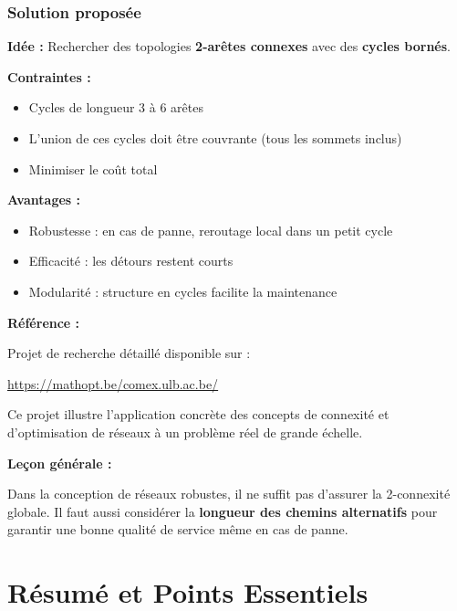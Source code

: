 \documentclass[12pt,a4paper]{article}
\begin{document}
\subsubsection{Solution proposée}

\begin{definition}
\textbf{Idée :} Rechercher des topologies \textcolor{defvert}{\textbf{2-arêtes connexes}} avec des \textcolor{algoviolet}{\textbf{cycles bornés}}.

\textbf{Contraintes :}
\begin{itemize}
    \item Cycles de longueur 3 à 6 arêtes
    \item L'union de ces cycles doit être couvrante (tous les sommets inclus)
    \item Minimiser le coût total
\end{itemize}

\textbf{Avantages :}
\begin{itemize}
    \item \textcolor{titrebleu}{Robustesse} : en cas de panne, reroutage local dans un petit cycle
    \item \textcolor{defvert}{Efficacité} : les détours restent courts
    \item \textcolor{algoviolet}{Modularité} : structure en cycles facilite la maintenance
\end{itemize}
\end{definition}

\begin{notecours}
\textbf{Référence :}

Projet de recherche détaillé disponible sur :

\url{https://mathopt.be/comex.ulb.ac.be/}

Ce projet illustre l'application concrète des concepts de connexité et d'optimisation de réseaux à un problème réel de grande échelle.
\end{notecours}

\begin{astuce}
\textbf{Leçon générale :}

Dans la conception de réseaux robustes, il ne suffit pas d'assurer la 2-connexité globale. Il faut aussi considérer la \textcolor{importantrouge}{\textbf{longueur des chemins alternatifs}} pour garantir une bonne qualité de service même en cas de panne.
\end{astuce}

\newpage
\section{Résumé et Points Essentiels}
\end{document}
